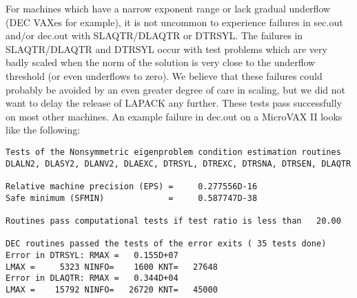 For machines which have a narrow exponent range or lack gradual
underflow (DEC VAXes for example), it is not uncommon to experience
failures in sec.out and/or dec.out with SLAQTR/DLAQTR or DTRSYL.
The failures in SLAQTR/DLAQTR and DTRSYL
occur with test problems which are very badly scaled when the norm of 
the solution is very close to the underflow 
threshold (or even underflows to zero).  We believe that these failures
could probably be avoided by an even greater degree of care in scaling,
but we did not want to delay the release of LAPACK any further.  These 
tests pass successfully on most other machines.  An example failure in 
dec.out on a MicroVAX II looks like the following:

\begin{verbatim}
Tests of the Nonsymmetric eigenproblem condition estimation routines
DLALN2, DLASY2, DLANV2, DLAEXC, DTRSYL, DTREXC, DTRSNA, DTRSEN, DLAQTR

Relative machine precision (EPS) =     0.277556D-16
Safe minimum (SFMIN)             =     0.587747D-38

Routines pass computational tests if test ratio is less than   20.00

DEC routines passed the tests of the error exits ( 35 tests done)
Error in DTRSYL: RMAX =   0.155D+07
LMAX =     5323 NINFO=    1600 KNT=   27648
Error in DLAQTR: RMAX =   0.344D+04
LMAX =    15792 NINFO=   26720 KNT=   45000
\end{verbatim}

